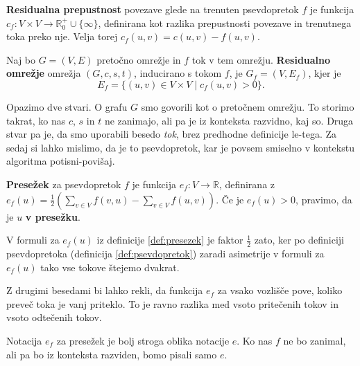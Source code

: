 \documentclass[mat1]{fmfdelo}
\begin{document}
\begin{definicija}\label{def:resprepustnost}
\textbf{Residualna prepustnost} povezave glede na trenuten pse\-vdo\-pre\-tok $f$ je funkcija $c_f \colon V \times V \rightarrow \mathbb{R}^+_0 \cup \{\infty\}$, definirana kot razlika prepustnosti povezave in trenutnega toka preko nje. Velja torej $c_f(u,v) = c(u,v) - f(u,v)$.
\end{definicija}

\begin{definicija}
  Naj bo $G = (V,E)$ pretočno omrežje in $f$ tok v tem omrežju. \textbf{Residualno omrežje} omrežja $(G,c,s,t)$, inducirano s tokom $f$, je $G_f = (V,E_f)$, kjer je \[ E_f = \{ (u,v) \in V \times V \mid c_f(u,v) > 0 \}. \]
\end{definicija}

\begin{opomba}
  Opazimo dve stvari. O grafu $G$ smo govorili kot o pretočnem omrežju. To storimo takrat, ko nas $c$, $s$ in $t$ ne zanimajo, ali pa je iz konteksta razvidno, kaj so. Druga stvar pa je, da smo uporabili besedo \textit{tok}, brez predhodne definicije le-tega.
  Za sedaj si lahko mislimo, da je to psevdopretok, kar je povsem smiselno v kontekstu algoritma potisni-povišaj.
\end{opomba}

\begin{definicija}\label{def:presezek}
\textbf{Presežek} za psevdopretok $f$ je funkcija $e_f \colon V \rightarrow \mathbb{R}$, definirana z $e_f(u) = \frac{1}{2}\left(\sum_{v \in V} f(v,u) - \sum_{v \in V} f(u,v)\right)$. Če je $e_f(u) > 0$, pravimo, da je $u$ \textbf{v presežku}.
\end{definicija}

\begin{opomba}
  V formuli za $e_f(u)$ iz definicije \ref{def:presezek} je faktor $\frac{1}{2}$ zato, ker po definiciji psevdopretoka (definicija \ref{def:psevdopretok}) zaradi asimetrije v formuli za $e_f(u)$ tako vse tokove štejemo dvakrat.
\end{opomba}

Z drugimi besedami bi lahko rekli, da funkcija $e_f$ za vsako vozlišče pove, koliko preveč toka je vanj priteklo. To je ravno razlika med vsoto pritečenih tokov in vsoto odtečenih tokov.

\begin{opomba}
  Notacija $e_f$ za presežek je bolj stroga oblika notacije $e$. Ko nas $f$ ne bo zanimal, ali pa bo iz konteksta razviden, bomo pisali samo $e$.
\end{opomba}
\end{document}
